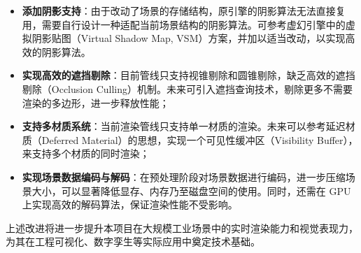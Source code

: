 \begin{itemize}
    \item \textbf{添加阴影支持}：由于改动了场景的存储结构，原引擎的阴影算法无法直接复用，需要自行设计一种适配当前场景结构的阴影算法。可参考虚幻引擎中的虚拟阴影贴图（Virtual Shadow Map, VSM）方案\cite{VSM}，并加以适当改动，以实现高效的阴影算法。

    \item \textbf{实现高效的遮挡剔除}：目前管线只支持视锥剔除和圆锥剔除，缺乏高效的遮挡剔除（Occlusion Culling）机制。未来可引入遮挡查询技术，剔除更多不需要渲染的多边形，进一步释放性能\cite{coorg1997}；

    \item \textbf{支持多材质系统}：当前渲染管线只支持单一材质的渲染。未来可以参考延迟材质（Deferred Material）的思想，实现一个可见性缓冲区（Visibility Buffer），来支持多个材质的同时渲染\cite{burns2013}；

    \item \textbf{实现场景数据编码与解码}：在预处理阶段对场景数据进行编码，进一步压缩场景大小，可以显著降低显存、内存乃至磁盘空间的使用\cite{Mlakar2024}。同时，还需在 GPU 上实现高效的解码算法，保证渲染性能不受影响。
\end{itemize}

上述改进将进一步提升本项目在大规模工业场景中的实时渲染能力和视觉表现力，为其在工程可视化、数字孪生等实际应用中奠定技术基础。
